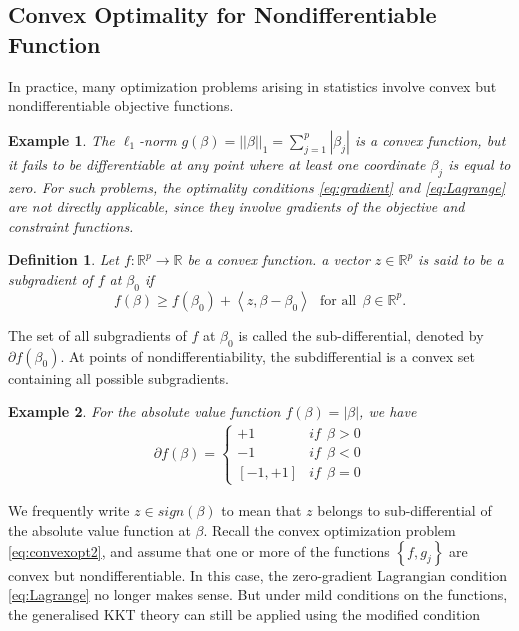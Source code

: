 \documentclass[a4paper,12pt,openany]{report}
\theoremstyle{plain}
\theoremstyle{plain}
\theoremstyle{plain}
\theoremstyle{plain}
\theoremstyle{plain}
\theoremstyle{plain}
\theoremstyle{plain}
\newtheorem{definition}{\textbf{Definition}}[section]
\theoremstyle{plain}
\newtheorem{example}{\textbf{Example}}[section]
\theoremstyle{plain}
\theoremstyle{plain}
\theoremstyle{plain}
\theoremstyle{plain}
\begin{document}
\subsection{Convex Optimality for Nondifferentiable Function}
In practice, many optimization problems arising in statistics involve convex but nondifferentiable objective functions. 
\begin{example}
	The $\ell_1$-norm $g(\beta)=||\beta||_1=\sum_{j=1}^{p}|\beta_j|$ is a convex function, but it fails to be differentiable at any point where at least one coordinate $\beta_j$ is equal to zero. For such problems, the optimality conditions \eqref{eq:gradient} and \eqref{eq:Lagrange} are not directly applicable, since they involve gradients of the objective and constraint functions.
\end{example} 
\begin{definition}
	Let $f : \mathbb{R}^p\to\mathbb{R}$ be a convex function. a vector $z\in\mathbb{R}^p$ is said to be a subgradient of $f$ at $\beta_0$ if
	\begin{equation}
	f(\beta) \geq f(\beta_0) + \left\langle z, \beta-\beta_0\right\rangle \ \ \ \text{for all} \ \ \beta\in\mathbb{R}^p.
	\end{equation}
\end{definition}
The set of all subgradients of $f$ at $\beta_0$ is called the sub-differential, denoted by $\partial f(\beta_0)$. At points of nondifferentiability, the subdifferential is a convex set containing all possible subgradients.
\begin{example}
	For the absolute value function $f(\beta) = |\beta|$, we have
	\begin{eqnarray}\label{eqa:absolutevalue}
	\partial f(\beta) = \left\lbrace\begin{array}{ll}
	+1 & if\ \  \beta > 0\\
	-1 & if\ \  \beta < 0\\
	\left[-1,+1\right] & if\ \ \beta = 0
	\end{array}\right.
	\end{eqnarray}
\end{example}
We frequently write $z\in sign(\beta)$ to mean that $z$ belongs to sub-differential of the absolute value function at $\beta$. Recall the convex optimization problem \eqref{eq:convexopt2}, and assume that one or more of the functions $\left\lbrace f, g_j\right\rbrace$ are convex but nondifferentiable. In this case, the zero-gradient Lagrangian condition \eqref{eq:Lagrange} no longer makes sense. But under mild conditions on the functions, the generalised KKT theory can still be applied using the modified condition
\end{document}
